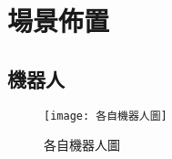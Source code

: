 \chapter{場景佈置}
\section{機器人}
\begin{figure}[hbt!]
\begin{center}
\label{各自機器人圖}
\texttt{[image: 各自機器人圖]}
\caption{\Large 各自機器人圖}
\end{center}
\end{figure}
